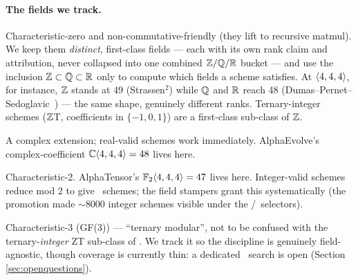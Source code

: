 \paragraph{The fields we track.}
\begin{description}[itemsep=2pt]
  \item[\Integers, \Rationals, \Reals] Characteristic-zero and
    non-commutative-friendly (they lift to recursive matmul). We keep
    them \emph{distinct}, first-class fields --- each with its own rank
    claim and attribution, never collapsed into one combined
    \(\mathbb{Z}/\mathbb{Q}/\mathbb{R}\) bucket --- and use the inclusion
    \(\mathbb{Z}\subset\mathbb{Q}\subset\mathbb{R}\) only to compute which
    fields a scheme satisfies. At \(\langle 4, 4, 4 \rangle\), for instance,
    \(\mathbb{Z}\) stands at 49 (Strassen\(^2\)) while \(\mathbb{Q}\) and
    \(\mathbb{R}\) reach 48 (Dumas--Pernet--Sedoglavic~\cite{dps2025}) ---
    the same shape, genuinely different ranks. Ternary-integer
    schemes (\(\mathbb{Z}\)T, coefficients in \(\{-1,0,1\}\)) are a
    first-class sub-class of \(\mathbb{Z}\).
  \item[\Complex] A complex extension; real-valid schemes work
    immediately. AlphaEvolve's complex-coefficient
    \(\mathbb{C}\langle 4, 4, 4 \rangle = 48\) lives here.
  \item[\Ftwo] Characteristic-2. AlphaTensor's
    \(\mathbb{F}_2\langle 4, 4, 4 \rangle = 47\) lives here. Integer-valid
    schemes reduce mod 2 to give \Ftwo\ schemes; the field stampers
    grant this systematically (the promotion made \({\sim}8000\)
    integer schemes visible under the \Ftwo/\Fthree\ selectors).
  \item[\Fthree] Characteristic-3 (GF(3)) --- ``ternary modular'',
    not to be confused with the ternary-\emph{integer} ZT sub-class of
    \Integers. We track it so the discipline is genuinely
    field-agnostic, though coverage is currently thin: a dedicated
    \Fthree\ search is open (Section \ref{sec:openquestions}).
\end{description}

